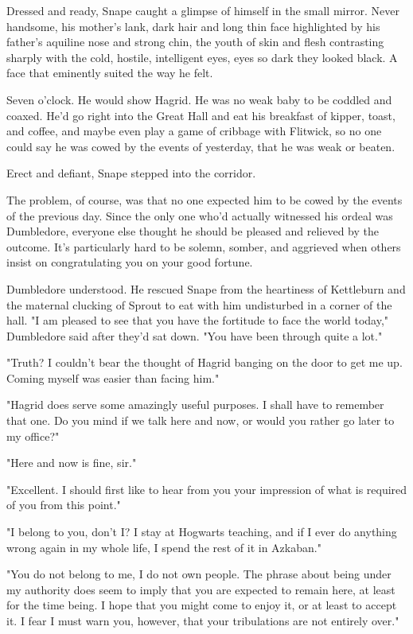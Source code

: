 \documentclass[a4paper,11pt]{article}
\begin{document}
Dressed and ready, Snape caught a glimpse of himself in the small mirror. Never handsome, his mother's lank, dark hair and long thin face highlighted by his father's aquiline nose and strong chin, the youth of skin and flesh contrasting sharply with the cold, hostile, intelligent eyes, eyes so dark they looked black. A face that eminently suited the way he felt.

Seven o'clock. He would show Hagrid. He was no weak baby to be coddled and coaxed. He'd go right into the Great Hall and eat his breakfast of kipper, toast, and coffee, and maybe even play a game of cribbage with Flitwick, so no one could say he was cowed by the events of yesterday, that he was weak or beaten.

Erect and defiant, Snape stepped into the corridor.

The problem, of course, was that no one expected him to be cowed by the events of the previous day. Since the only one who'd actually witnessed his ordeal was Dumbledore, everyone else thought he should be pleased and relieved by the outcome. It's particularly hard to be solemn, somber, and aggrieved when others insist on congratulating you on your good fortune.

Dumbledore understood. He rescued Snape from the heartiness of Kettleburn and the maternal clucking of Sprout to eat with him undisturbed in a corner of the hall. "I am pleased to see that you have the fortitude to face the world today," Dumbledore said after they'd sat down. "You have been through quite a lot."

"Truth? I couldn't bear the thought of Hagrid banging on the door to get me up. Coming myself was easier than facing him."

"Hagrid does serve some amazingly useful purposes. I shall have to remember that one. Do you mind if we talk here and now, or would you rather go later to my office?"

"Here and now is fine, sir."

"Excellent. I should first like to hear from you your impression of what is required of you from this point."

"I belong to you, don't I? I stay at Hogwarts teaching, and if I ever do anything wrong again in my whole life, I spend the rest of it in Azkaban."

"You do not belong to me, I do not own people. The phrase about being under my authority does seem to imply that you are expected to remain here, at least for the time being. I hope that you might come to enjoy it, or at least to accept it. I fear I must warn you, however, that your tribulations are not entirely over."
\end{document}
